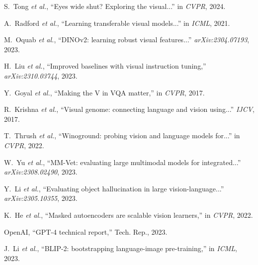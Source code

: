 \documentclass[11pt]{article}
\begin{document}
\begin{thebibliography}{10}
    \setlength{\itemsep}{0.1em}  
    \setlength{\parskip}{0pt}     

        S.~Tong \emph{et al.},
        ``Eyes wide shut? Exploring the visual...''
        in \emph{CVPR}, 2024.
        
        A.~Radford \emph{et al.},
        ``Learning transferable visual models...''
        in \emph{ICML}, 2021.

        M.~Oquab \emph{et al.},
        ``DINOv2: learning robust visual features...''
        \emph{arXiv:2304.07193}, 2023.

        H.~Liu \emph{et al.},
        ``Improved baselines with visual instruction tuning,''
        \emph{arXiv:2310.03744}, 2023.

        Y.~Goyal \emph{et al.},
        ``Making the V in VQA matter,''
        in \emph{CVPR}, 2017.

        R.~Krishna \emph{et al.},
        ``Visual genome: connecting language and vision using...''
        \emph{IJCV}, 2017.

        T.~Thrush \emph{et al.},
        ``Winoground: probing vision and language models for...''
        in \emph{CVPR}, 2022.

        W.~Yu \emph{et al.},
        ``MM-Vet: evaluating large multimodal models for integrated...''
        \emph{arXiv:2308.02490}, 2023.

        Y.~Li \emph{et al.},
        ``Evaluating object hallucination in large vision-language...''
        \emph{arXiv:2305.10355}, 2023.
            
        K.~He \emph{et al.},
        ``Masked autoencoders are scalable vision learners,''
        in \emph{CVPR}, 2022.
        
        OpenAI,
        ``GPT-4 technical report,''
        Tech. Rep., 2023.
        
        J.~Li \emph{et al.},
        ``BLIP-2: bootstrapping language-image pre-training,''
        in \emph{ICML}, 2023.
        
        
\end{thebibliography}
    
\end{document}
